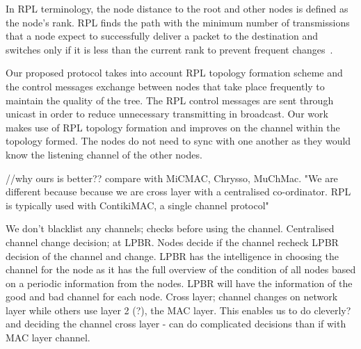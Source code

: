 In RPL terminology, the node distance to the root and other nodes is defined as the node's rank. RPL finds the path with the minimum number of transmissions that a node expect to successfully deliver a packet to the destination and switches only if it is less than the current rank to prevent frequent changes~\cite{mrhof}. 






Our proposed protocol takes into account RPL topology formation scheme and the control messages exchange between nodes that take place frequently to maintain the quality of the tree. The RPL control messages are sent through unicast in order to reduce unnecessary transmitting in broadcast. Our work makes use of RPL topology formation and improves on the channel within the topology formed. The nodes do not need to sync with one another as they would know the listening channel of the other nodes.

//why ours is better?? compare with MiCMAC, Chrysso, MuChMac. "We are different because because we are cross layer with a centralised co-ordinator. RPL is typically used with ContikiMAC, a single channel protocol"

We don't blacklist any channels; checks before using the channel. Centralised channel change decision; at LPBR. Nodes decide if the channel recheck LPBR decision of the channel and change. LPBR has the intelligence in choosing the channel for the node as it has the full overview of the condition of all nodes based on a periodic information from the nodes. LPBR will have the information of the good and bad channel for each node. 
Cross layer; channel changes on network layer while others use layer 2 (?), the MAC layer. This enables us to do cleverly? and deciding the channel cross layer - can do complicated decisions than if with MAC layer channel.


